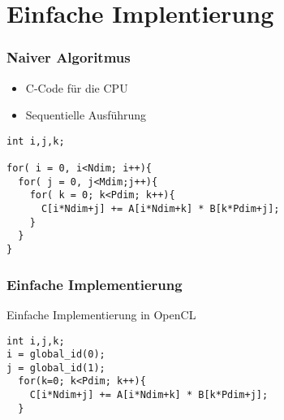 \documentclass{beamer}
\begin{document}
\section{Einfache Implentierung}



\begin{frame}[fragile]
\frametitle{Naiver Algoritmus}

\begin{itemize}
\item C-Code f\"ur die CPU 
\item Sequentielle Ausf\"uhrung
\end{itemize}

\begin{lstlisting}[style=customc,caption=Matrixmultiplication in C]
int i,j,k;

for( i = 0, i<Ndim; i++){
  for( j = 0, j<Mdim;j++){
    for( k = 0; k<Pdim; k++){
      C[i*Ndim+j] += A[i*Ndim+k] * B[k*Pdim+j]; 
    }
  }
}
\end{lstlisting}



\end{frame}



\begin{frame}[fragile]
\frametitle{Einfache Implementierung}
 
Einfache Implementierung in OpenCL
\begin{lstlisting}[style=customc,caption=Einfachster Code in OpenCL]
int i,j,k;
i = global_id(0);
j = global_id(1);
  for(k=0; k<Pdim; k++){
    C[i*Ndim+j] += A[i*Ndim+k] * B[k*Pdim+j]; 
  }
\end{lstlisting}


\end{frame}

\begin{frame}

	
\end{frame}

\end{document}

